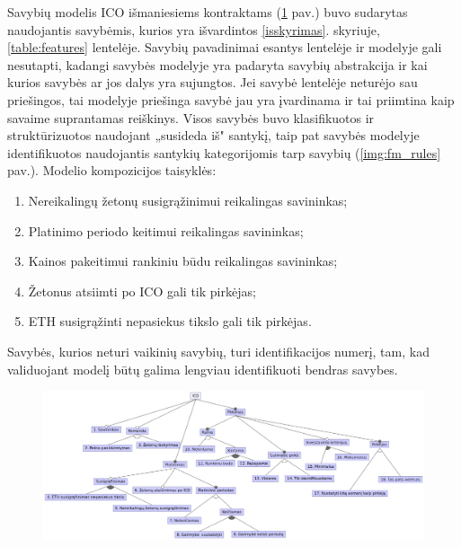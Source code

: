 \documentclass{VUMIFPSkursinis}
\begin{document}
Savybių modelis ICO išmaniesiems kontraktams (\ref{img:fm_ico} pav.) buvo sudarytas naudojantis savybėmis, kurios yra išvardintos \ref{isskyrimas}. skyriuje, \ref{table:features} lentelėje. Savybių pavadinimai esantys lentelėje ir modelyje gali nesutapti, kadangi savybės modelyje yra padaryta savybių abstrakcija ir kai kurios savybės ar jos dalys yra sujungtos. Jei savybė lentelėje neturėjo sau priešingos, tai modelyje priešinga savybė jau yra įvardinama ir tai priimtina kaip savaime suprantamas reiškinys. Visos savybės buvo klasifikuotos ir struktūrizuotos naudojant „susideda iš" santykį, taip pat savybės modelyje identifikuotos naudojantis santykių kategorijomis tarp savybių (\ref{img:fm_rules} pav.). Modelio kompozicijos taisyklės:
\begin{enumerate}[topsep=0pt,itemsep=-1ex,partopsep=1ex,parsep=1ex]
\item Nereikalingų žetonų susigrąžinimui reikalingas savininkas;
\item Platinimo periodo keitimui reikalingas savininkas;
\item Kainos pakeitimui rankiniu būdu reikalingas savininkas;
\item Žetonus atsiimti po ICO gali tik pirkėjas;
\item ETH susigrąžinti nepasiekus tikslo gali tik pirkėjas.
\end{enumerate}

Savybės, kurios neturi vaikinių savybių, turi identifikacijos numerį, tam, kad validuojant modelį būtų galima lengviau identifikuoti bendras savybes.

\begin{figure}

\begin{center}
    \includegraphics[scale=0.7]{img/ico_model_num}
    \label{img:fm_ico}
\end{center}

\end{figure}
\pagebreak
\end{document}

